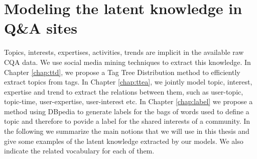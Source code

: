 







\clearpage
\section{Modeling the latent knowledge in Q\&A sites}

Topics, interests, expertises, activities, trends are implicit  in the available raw CQA data. We use social media mining techniques to extract this knowledge.
In Chapter \ref{chap:ttd}, we propose a Tag Tree Distribution method to efficiently extract topics from tags. In Chapter \ref{chap:ttea}, we jointly model topic, interest, expertise and trend to extract the relations between them, such as user-topic, topic-time, user-expertise, user-interest etc. In Chapter \ref{chap:label} we propose a method using DBpedia to generate labels for the bags of words  used to define a topic and therefore to povide a label for the shared interests of a community. 
In the following we summarize the main notions that we will use in this thesis and give some examples of the latent knowledge extracted by our models. We also indicate the related vocabulary for each of them.

